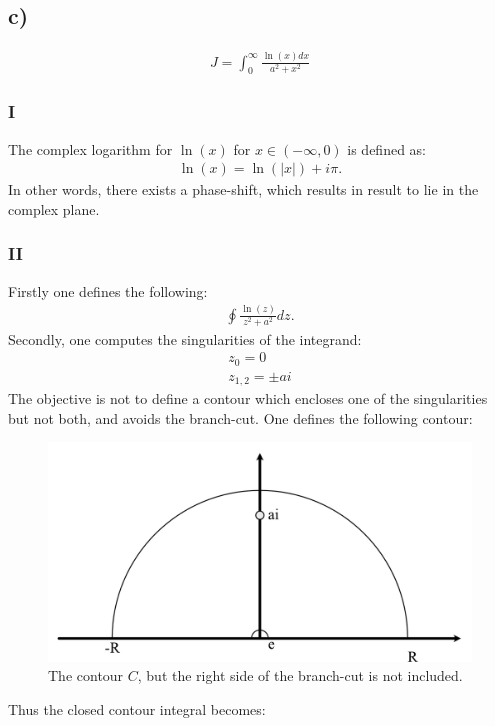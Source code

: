 \documentclass{article}
\begin{document}
\subsection*{c)}
\begin{align*}
    J = \int_0^\infty\frac{\ln(x)dx}{a^2 + x^2}
\end{align*}
\subsubsection*{I}
The complex logarithm for $\ln(x)$ for $x\in(-\infty, 0)$ is defined as:
\begin{align*}
    \ln(x) = \ln(|x|) + i\pi.
\end{align*}In other words, there exists a phase-shift, which results in result to lie in the complex plane.

\subsubsection*{II}
Firstly one defines the following:
\begin{align}
    \oint \frac{\ln(z)}{z^2 + a^2}dz.
\end{align}Secondly, one computes the singularities of the integrand:
\begin{align*}
    z_0 = 0\\
    z_{1,2} =\pm ai
\end{align*}The objective is not to define a contour which encloses one of the singularities but not both, and avoids the branch-cut. One defines the following contour:
\begin{figure}[H]
    \centering
    \includegraphics[scale = 0.5]{image.png}
    \caption{The contour $C$, but the right side of the branch-cut is not included.}
    \label{fig: 3cII}
\end{figure}\noindent Thus the closed contour integral becomes:
\end{document}
